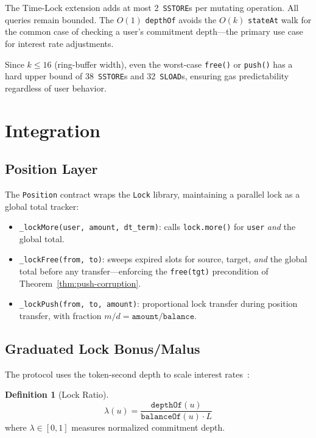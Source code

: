 \documentclass[10pt,a4paper,twocolumn]{article}
\theoremstyle{definition}
\newtheorem{definition}{Definition}[section]
\theoremstyle{plain}
\theoremstyle{remark}
\begin{document}
The Time-Lock extension adds at most 2~\texttt{SSTORE}s per mutating operation. All queries remain bounded. The $O(1)$ \texttt{depthOf} avoids the $O(k)$ \texttt{stateAt} walk for the common case of checking a user's commitment depth---the primary use case for interest rate adjustments.

Since $k \leq 16$ (ring-buffer width), even the worst-case \texttt{free()} or \texttt{push()} has a hard upper bound of 38~\texttt{SSTORE}s and 32~\texttt{SLOAD}s, ensuring gas predictability regardless of user behavior.

\section{Integration}
\label{sec:integration}

\subsection{Position Layer}

The \texttt{Position} contract wraps the \texttt{Lock} library, maintaining a parallel lock as a global total tracker:

\begin{itemize}[nosep]
\item \texttt{\_lockMore(user, amount, dt\_term)}: calls \texttt{lock.more()} for \texttt{user} \emph{and} the global total.
\item \texttt{\_lockFree(from, to)}: sweeps expired slots for source, target, \emph{and} the global total before any transfer---enforcing the \texttt{free(tgt)} precondition of Theorem~\ref{thm:push-corruption}.
\item \texttt{\_lockPush(from, to, amount)}: proportional lock transfer during position transfer, with fraction $m/d = \texttt{amount}/\texttt{balance}$.
\end{itemize}

\subsection{Graduated Lock Bonus/Malus}

The protocol uses the token-second depth to scale interest rates~\cite{wp}:

\begin{definition}[Lock Ratio]
\label{def:lock-ratio}
\[
\lambda(u) = \frac{\texttt{depthOf}(u)}{\texttt{balanceOf}(u) \cdot L}
\]
where $\lambda \in [0,1]$ measures normalized commitment depth.
\end{definition}
\end{document}
